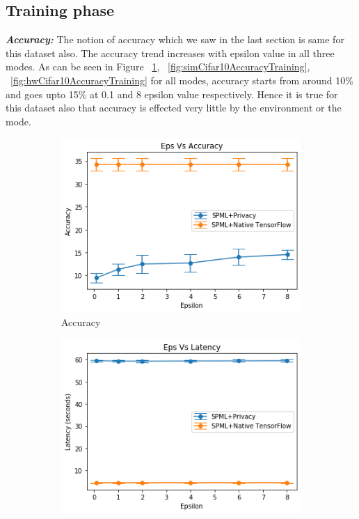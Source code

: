 \subsection{Training phase}
\textbf{\textit{Accuracy: }} The notion of accuracy which we saw in the last section is same for this dataset also. The accuracy trend increases with epsilon value in all three modes. As can be seen in Figure ~\ref{fig:nativeCifar10AccuracyTraining}, ~\ref{fig:simCifar10AccuracyTraining}, ~\ref{fig:hwCifar10AccuracyTraining} for all modes, accuracy starts from around 10\% and goes upto 15\% at 0.1 and 8 epsilon value respectively. Hence it is true for this dataset also that accuracy is effected very little by the environment or the mode.
\begin{figure}
     \begin{subfigure}{0.5\textwidth}
         \includegraphics[width=\textwidth]{images/Training/Cifar10NativeAccuracy.png}
         \caption{Accuracy}
         \label{fig:nativeCifar10AccuracyTraining}
     \end{subfigure}
     \begin{subfigure}{0.5\textwidth}
         \includegraphics[width=\textwidth]{images/Training/Cifar10lNativeLatency.png}

\end{subfigure}
\end{figure}
